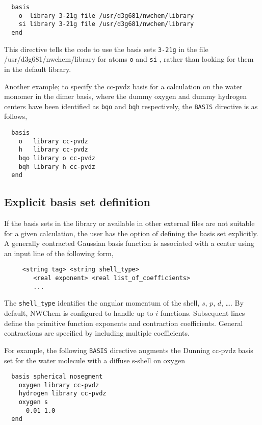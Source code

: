 \begin{verbatim}
  basis
    o  library 3-21g file /usr/d3g681/nwchem/library
    si library 3-21g file /usr/d3g681/nwchem/library
  end
\end{verbatim}

This directive tells the code to use the basis sets \verb+3-21g+ in
the file /usr/d3g681/nwchem/library for atoms \verb+o+ and \verb+si+ ,
rather than looking for them in the default library.

Another example;  to specify the cc-pvdz basis for a calculation on
the water monomer in the dimer basis, where the dummy oxygen and dummy
hydrogen centers have been identified as \verb+bqo+ and \verb+bqh+
respectively, the \verb+BASIS+ directive is as follows,

\begin{verbatim}
  basis
    o   library cc-pvdz
    h   library cc-pvdz
    bqo library o cc-pvdz
    bqh library h cc-pvdz
  end
\end{verbatim}

\subsection{Explicit basis set definition}

If the basis sets in the library or available in other external files
are not suitable for a given calculation, the user has the option
of defining the basis set explicitly.
A generally contracted Gaussian basis function is associated with a
center using an input line of the following form,
\begin{verbatim}
     <string tag> <string shell_type>
        <real exponent> <real list_of_coefficients>
        ...
\end{verbatim}

The \verb+shell_type+ identifies the angular momentum of the shell,
$s$, $p$, $d$, \ldots.  By default, NWChem is configured to handle up
to $i$ functions.  Subsequent lines define the primitive function
exponents and contraction coefficients.  General contractions are
specified by including multiple coefficients.

For example, the following \verb+BASIS+ directive augments the Dunning
cc-pvdz basis set for the water molecule with a diffuse s-shell on
oxygen
\begin{verbatim}
  basis spherical nosegment
    oxygen library cc-pvdz
    hydrogen library cc-pvdz
    oxygen s
      0.01 1.0
  end
\end{verbatim}

